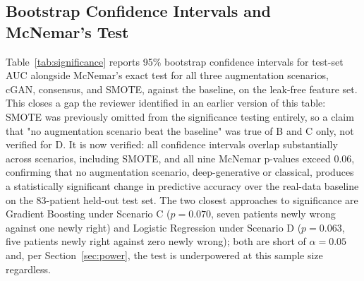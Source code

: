\documentclass[journal]{IEEEtran}
\begin{document}
\subsection{Bootstrap Confidence Intervals and McNemar's Test}

Table~\ref{tab:significance} reports 95\% bootstrap confidence intervals for test-set AUC alongside McNemar's exact test for all three augmentation scenarios, cGAN, consensus, and SMOTE, against the baseline, on the leak-free feature set. This closes a gap the reviewer identified in an earlier version of this table: SMOTE was previously omitted from the significance testing entirely, so a claim that "no augmentation scenario beat the baseline" was true of B and C only, not verified for D. It is now verified: all confidence intervals overlap substantially across scenarios, including SMOTE, and all nine McNemar p-values exceed 0.06, confirming that no augmentation scenario, deep-generative or classical, produces a statistically significant change in predictive accuracy over the real-data baseline on the 83-patient held-out test set. The two closest approaches to significance are Gradient Boosting under Scenario C ($p = 0.070$, seven patients newly wrong against one newly right) and Logistic Regression under Scenario D ($p = 0.063$, five patients newly right against zero newly wrong); both are short of $\alpha = 0.05$ and, per Section~\ref{sec:power}, the test is underpowered at this sample size regardless.
\end{document}
